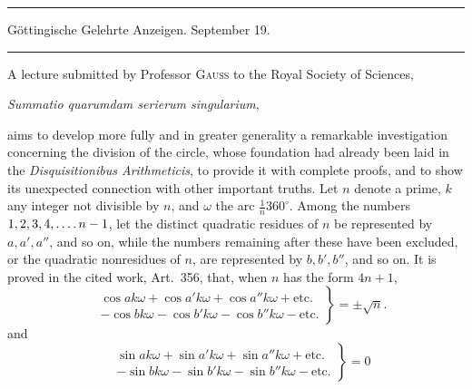\clearpage{}%
\begin{center}
\rule{.98\linewidth}{.3pt}\par
Göttingische Gelehrte Anzeigen. September 19.\par
\rule{.98\linewidth}{.3pt}
\end{center}

A lecture submitted by Professor \textsc{Gauss} to the Royal Society of Sciences,
\begin{center}\emph{Summatio quarumdam serierum singularium},\end{center}
aims to develop more fully and in greater generality a remarkable investigation concerning the division of the circle, whose foundation had already been laid in the \emph{Disquisitionibus Arithmeticis}, to provide it with complete proofs, and to show its unexpected connection with other important truths. Let $n$ denote a prime, $k$ any integer not divisible by $n$, and $\omega$ the arc $\frac1n360^\circ$. Among the numbers $1,2,3,4,\mathinner{.\,.\,.\,.} n-1$, let the distinct quadratic residues of $n$ be represented by $a,a',a''$, and so on, while the numbers remaining after these have been excluded, or the quadratic nonresidues of $n$, are represented by $b,b',b''$, and so on. It is proved in the cited work, Art.~356, that, when $n$ has the form $4n+1$,
\[
\left.\begin{aligned}
&\cos ak\omega+\cos a'k\omega+\cos a''k\omega+\text{etc.}\\
&-\cos bk\omega-\cos b'k\omega-\cos b''k\omega-\text{etc.}
\end{aligned}\right\}=\pm\surd n.
\]
and
\[
\left.\begin{aligned}
&\sin ak\omega+\sin a'k\omega+\sin a''k\omega+\text{etc.}\\
&-\sin bk\omega-\sin b'k\omega-\sin b''k\omega-\text{etc.}
\end{aligned}\right\}=0
\]
%
